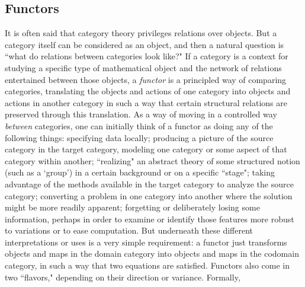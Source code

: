 \documentclass[a4paper]{book}
\theoremstyle{definition}
\theoremstyle{definition}
\theoremstyle{definition}
\theoremstyle{theorem}
\theoremstyle{definition}
\begin{document}
	\subsection{Functors}
	It is often said that category theory privileges relations over objects. But a category itself can be considered as an object, and then a natural question is ``what do relations between categories look like?" If a category is a context for studying a specific type of mathematical object and the network of relations entertained between those objects, a \textit{functor} is a principled way of comparing categories, translating the objects and actions of one category into objects and actions in another category in such a way that certain structural relations are preserved through this translation. As a way of moving in a controlled way \textit{between} categories, one can initially think of a functor as doing any of the following things: specifying data locally; producing a picture of the source category in the target category, modeling one category or some aspect of that category within another; ``realizing" an abstract theory of some structured notion (such as a `group') in a certain background or on a specific ``stage"; taking advantage of the methods available in the target category to analyze the source category; converting a problem in one category into another where the solution might be more readily apparent; forgetting or deliberately losing some information, perhaps in order to examine or identify those features more robust to variations or to ease computation. But underneath these different interpretations or uses is a very simple requirement: a functor just transforms objects and maps in the domain category into objects and maps in the codomain category, in such a way that two equations are satisfied. Functors also come in two ``flavors," depending on their direction or variance. Formally, 
\end{document}
